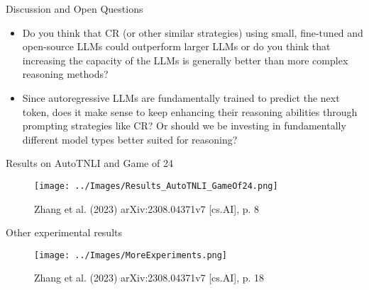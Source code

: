 \documentclass{beamer}
\begin{document}

\begin{frame}{Discussion and Open Questions}
    \begin{itemize}
        \item Do you think that CR (or other similar strategies) using small, fine-tuned and open-source LLMs could outperform larger LLMs or do you think that increasing the capacity of the LLMs is generally better than more complex reasoning methods?
        \item Since autoregressive LLMs are fundamentally trained to predict the next token, does it make sense to keep enhancing their reasoning abilities through prompting strategies like CR? Or should we be investing in fundamentally different model types better suited for reasoning?
    \end{itemize}
\end{frame}


\begin{frame}{Results on AutoTNLI and Game of 24}
    \begin{figure}
        \centering
        \texttt{[image: ../Images/Results\_AutoTNLI\_GameOf24.png]}

        \vspace{0.5em}
        {\tiny Zhang et al. (2023) arXiv:2308.04371v7 [cs.AI], p. 8}
    \end{figure}
\end{frame}

\begin{frame}{Other experimental results}
    \begin{figure}
        \centering
        \texttt{[image: ../Images/MoreExperiments.png]}

        \vspace{0.5em}
        {\tiny Zhang et al. (2023) arXiv:2308.04371v7 [cs.AI], p. 18}
    \end{figure}
\end{frame}
\end{document}
